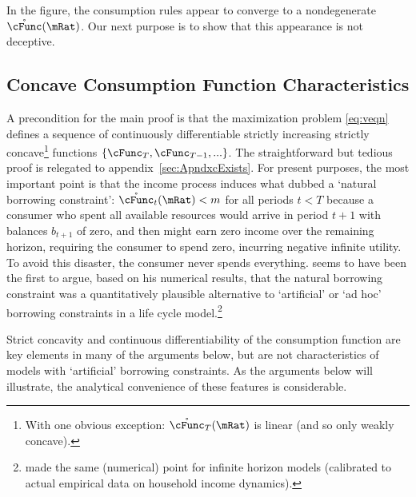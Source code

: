 \documentclass[BufferStockTheory]{subfiles}
\begin{document}
\hypertarget{Calibration}{}



\hypertarget{Symbols}{}



\providecommand{\figName}{Convergence-of-the-Consumption-Rules} %
\providecommand{\figFile}{cFuncsConverge} %
\hypertarget{\figFile}{}
\hypertarget{\figName}{}

In the figure, the consumption rules appear to converge to a nondegenerate $\mathring{\cFunc}(\mRat)$.  
Our next purpose is to show that this appearance is not deceptive.

\hypertarget{Concave-Consumption-Function-Characteristics}{}
\subsection{Concave Consumption Function Characteristics}\label{sec:cExists}

A precondition for the main proof is that the maximization problem \eqref{eq:veqn} defines a sequence of continuously differentiable strictly increasing strictly concave\footnote{With one obvious exception: $\mathring{\cFunc}_{T}(\mRat)$ is linear (and so only weakly concave).} functions $\{\cFunc_{T},\cFunc_{T-1},...\}$.  The straightforward but tedious proof is relegated to appendix~\ref{sec:ApndxcExists}.  For present purposes, the most important point is that the income process induces what \cite{aiyagari:ge} dubbed a `natural borrowing constraint':  $\mathring{\cFunc}_{t}(\mRat) < m$ for all periods $t < T$ because a consumer who spent all available resources would arrive in period $t+1$ with balances $b_{t+1}$ of zero, and then might earn zero income over the remaining horizon, requiring the consumer to spend zero, incurring negative infinite utility.  To avoid this disaster, the consumer never spends everything.  \cite{zeldesStochastic} seems to have been the first to argue, based on his numerical results, that the natural borrowing constraint was a quantitatively plausible alternative to `artificial' or `ad hoc' borrowing constraints in a life cycle model.\footnote{\cite{carrollBrookings} made the same (numerical) point for infinite horizon models (calibrated to actual empirical data on household income dynamics).}

Strict concavity and continuous differentiability of the consumption function are key elements in many of the arguments below, but are not characteristics of models with `artificial' borrowing constraints.  As the arguments below will illustrate, the analytical convenience of these features is considerable.
\end{document}
